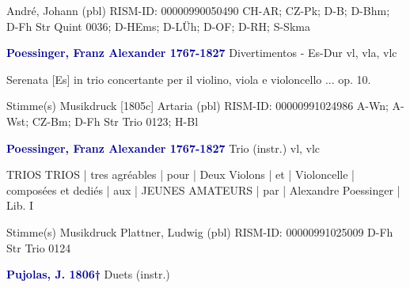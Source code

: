 \documentclass[twocolumn]{book}
\begin{document}
\newline André, Johann  (pbl)
\newline RISM-ID: 00000990050490
\newline CH-AR; CZ-Pk; D-B; D-Bhm; D-Fh  Str Quint 0036; D-HEms; D-LÜh; D-OF; D-RH; S-Skma
\newline \par \vspace{7pt} \textcolor{darkblue}{\textbf{Poessinger, Franz Alexander  1767-1827}}
\newline Divertimentos - Es-Dur
\newline vl, vla, vlc
\newline \begin{itshape}Serenata [Es] in trio concertante per il violino, viola e violoncello ... op. 10.\end{itshape} 
\newline \textcolor{darkblue}{}  Stimme(s)
\newline Musikdruck  [1805c]
\newline Artaria  (pbl)
\newline RISM-ID: 00000991024986
\newline A-Wn; A-Wst; CZ-Bm; D-Fh  Str Trio 0123; H-Bl
\newline \par \vspace{7pt} \textcolor{darkblue}{\textbf{Poessinger, Franz Alexander  1767-1827}}
\newline Trio (instr.)
 vl, vlc
\newline \begin{itshape}TRIOS TRIOS | tres agréables | pour | Deux Violons | et | Violoncelle | composées et dediés | aux | JEUNES AMATEURS | par | Alexandre Poessinger | Lib. I\end{itshape} 
\newline \textcolor{darkblue}{}  Stimme(s)
\newline Musikdruck
\newline Plattner, Ludwig  (pbl)
\newline RISM-ID: 00000991025009
\newline D-Fh  Str Trio 0124
\newline \par \vspace{7pt} \textcolor{darkblue}{\textbf{Pujolas, J.  1806†}}
\newline Duets (instr.)
\end{document}

